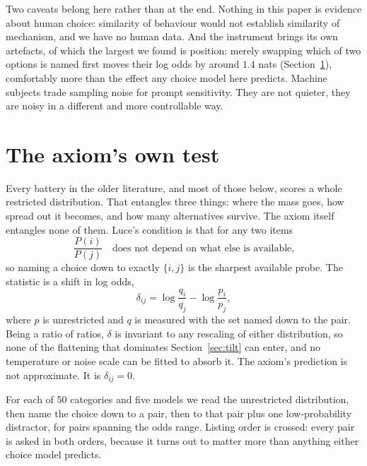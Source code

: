 \documentclass[11pt]{article}
\begin{document}
Two caveats belong here rather than at the end. Nothing in this paper is
evidence about human choice: similarity of behaviour would not establish
similarity of mechanism, and we have no human data. And the instrument brings
its own artefacts, of which the largest we found is position: merely swapping
which of two options is named first moves their log odds by around $1.4$ nats
(Section~\ref{sec:odds}), comfortably more than the effect any choice model
here predicts. Machine subjects trade sampling noise for prompt sensitivity.
They are not quieter, they are noisy in a different and more controllable way.

\section{The axiom's own test}
\label{sec:odds}

Every battery in the older literature, and most of those below, scores a whole
restricted distribution. That entangles three things: where the mass goes, how
spread out it becomes, and how many alternatives survive. The axiom itself
entangles none of them. Luce's condition is that for any two items
\begin{equation}
\frac{P(i)}{P(j)} \quad\text{does not depend on what else is available,}
\label{eq:iia}
\end{equation}
so naming a choice down to exactly $\{i,j\}$ is the sharpest available probe. The
statistic is a shift in log odds,
\begin{equation}
\delta_{ij} = \log\frac{q_i}{q_j} - \log\frac{p_i}{p_j},
\label{eq:delta}
\end{equation}
where $p$ is unrestricted and $q$ is measured with the set named down to the
pair. Being a ratio of ratios, $\delta$ is invariant to any rescaling of either
distribution, so none of the flattening that dominates
Section~\ref{sec:tilt} can enter, and no temperature or noise scale can be
fitted to absorb it. The axiom's prediction is not approximate. It is
$\delta_{ij} = 0$.

For each of 50 categories and five models we read the unrestricted
distribution, then name the choice down to a pair, then to that pair plus one
low-probability distractor, for pairs spanning the odds range. Listing order is
crossed: every pair is asked in both orders, because it turns out to matter more
than anything either choice model predicts.
\end{document}
